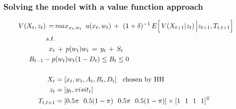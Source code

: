 \documentclass[aspectratio=149]{beamer}
\begin{document}
\begin{frame}
\frametitle{Solving the model with a value function approach}

\begin{align*}
V(X_t,z_t) \,=\, &max_{x_t,w_t}  \,\,\, u(x_t,w_t) \,+\,\, (1+\delta)^{-1} \, E \Big[\, V(X_{t+1}|z_{t})\,\Big| z_{t+1}, T_{t,t+1} \Big]
\\
s.t.& \\
x_t & \, + \, p(w_t) w_t \, = \, y_t  \, + \, S_t \\
B_{t-1}-p&(w_t) w_t (1-D_{t}) \leq B_{t} \leq 0  \\
\\
X_t &= [x_{t},w_{t},A_{t},B_{t},D_{t}] \hspace{2mm}\text{ chosen by HH }  \\
 z_t &= [y_t,visit_t]  \\
T_{t,t+1} &= [ 0.5\pi \,\,\,\, 0.5(1-\pi)\,\,\,\,  0.5\pi\,\,\,\,  0.5(1-\pi) ] \times [ 1 \,\,\,\, 1\,\,\,\,  1 \,\,\,\, 1 ]^{\text{T}}
\end{align*}



\end{frame}






\end{document}
